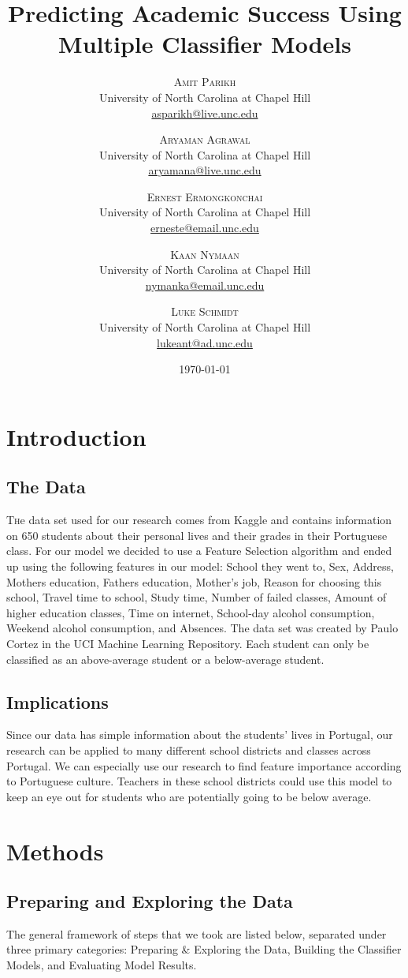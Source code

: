 \documentclass[twoside,twocolumn]{article}
\title{Predicting Academic Success Using Multiple Classifier Models} %
\author{%
\textsc{Amit Parikh} \\[1ex] %
\normalsize University of North Carolina at Chapel Hill \\ %
\normalsize \href{mailto:john@smith.com}{asparikh@live.unc.edu} %
\and %
\textsc{Aryaman Agrawal} \\[1ex] %
\normalsize University of North Carolina at Chapel Hill \\ %
\normalsize \href{mailto:john@smith.com}{aryamana@live.unc.edu} %
\and %
\textsc{Ernest Ermongkonchai} \\[1ex] %
\normalsize University of North Carolina at Chapel Hill \\ %
\normalsize \href{mailto:jane@smith.com}{erneste@email.unc.edu} %
\and %
\textsc{Kaan Nymaan} \\[1ex] %
\normalsize University of North Carolina at Chapel Hill \\ %
\normalsize \href{mailto:jane@smith.com}{nymanka@email.unc.edu} %
\and %
\textsc{Luke Schmidt} \\[1ex] %
\normalsize University of North Carolina at Chapel Hill \\ %
\normalsize \href{mailto:jane@smith.com}{lukeant@ad.unc.edu} %
}
\date{\today} %
\begin{document}
\maketitle


\section{Introduction}
\subsection{The Data}
\lettrine[nindent=0em,lines=3] {T}he data set used for our research comes from Kaggle and contains information on 650 students about their personal lives and their grades in their Portuguese class. For our model we decided to use a Feature Selection algorithm and ended up using the following features in our model: School they went to, Sex, Address, Mothers education, Fathers education, Mother’s job, Reason for choosing this school, Travel time to school, Study time, Number of failed classes, Amount of higher education classes, Time on internet, School-day alcohol consumption, Weekend alcohol consumption, and Absences. The data set was created by Paulo Cortez in the UCI Machine Learning Repository. Each student can only be classified as an above-average student or a below-average student.
\subsection{Implications}
Since our data has simple information about the students' lives in Portugal, our research can be applied to many different school districts and classes across Portugal. We can especially use our research to find feature importance according to Portuguese culture. Teachers in these school districts could use this model to keep an eye out for students who are potentially going to be below average.


\section{Methods}
\subsection{Preparing and Exploring the Data}
The general framework of steps that we took are listed below, separated under three primary categories: Preparing \& Exploring the Data, Building the Classifier Models, and Evaluating Model Results. 
\end{document}

